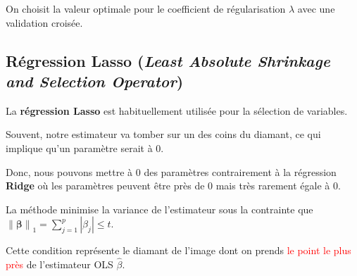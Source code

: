 \documentclass[10pt, french]{article}
\newcommand{\norm}[1]{\left\lVert#1\right\rVert}
\begin{document}
\begin{multicols*}{3}
On choisit la valeur optimale pour le coefficient de régularisation $\lambda$ avec une validation croisée.


\subsection*{Régression Lasso (\emph{Least Absolute Shrinkage and Selection Operator})}

La \textbf{régression Lasso} est habituellement utilisée pour la sélection de variables.

Souvent, notre estimateur va tomber sur un des coins du diamant, ce qui implique qu'un paramètre serait à 0. 

Donc, nous pouvons mettre à 0 des paramètres contrairement à la régression \textbf{Ridge} où les paramètres peuvent être près de 0 mais très rarement égale à 0.

La méthode minimise la variance de l'estimateur sous la contrainte que $\norm{\bm{\beta}}_1 = \sum_{j = 1}^{p} \left|\beta_{j} \right| \le t$.

Cette condition représente le diamant de l'image dont on prends \textcolor{red}{le point le plus près} de \textcolor{darkpastelpurple}{l'estimateur OLS $\widehat\beta$}.  

\end{multicols*}
\end{document}
